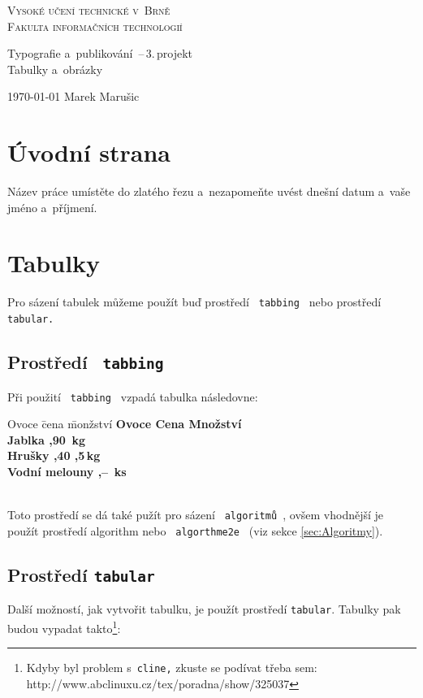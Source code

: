 \documentclass[11pt,a4paper,titlepage]{article}
\begin{document}
\begin{titlepage}

\begin{center}
\Huge\textsc{Vysoké učení technické v~Brně \\
\huge Fakulta informačních technologií\\}

\LARGE Typografie a~publikování \,--\,3.\,projekt \\
\Huge{Tabulky a~obrázky} \\
\end{center}
{\Large \today \hfill
Marek Marušic}
\end{titlepage}

\section{Úvodní strana}
Název práce umístěte do zlatého řezu a~nezapomeňte uvést dnešní datum a~vaše jméno a~příjmení.

\section{Tabulky}
Pro sázení tabulek můžeme použít buď prostředí \texttt{ tabbing } nebo prostředí \texttt{ tabular.}

\subsection{Prostředí \texttt{ tabbing }}
Při použití \texttt{ tabbing } vzpadá tabulka následovne:
\begin{tabbing}
Ovoce \qquad\qquad\= cena \qquad
\= monžství \kill
\bfseries Ovoce \>
\bfseries Cena \>
\bfseries Množství \\
Jablka ,90 \,kg\\
Hrušky ,40 ,5\,kg\\
Vodní melouny ,-- \,ks\\\\
\end{tabbing}
Toto prostředí se dá také pužít pro sázení \texttt{ algoritmů }, ovšem vhodnější je použít prostředí algorithm nebo 
\texttt{ algorthme2e } (viz sekce \ref{sec:Algoritmy}).

\subsection{Prostředí \texttt{tabular}}
Další možností, jak vytvořit tabulku, je použít prostředí \texttt{tabular}. Tabulky pak budou vypadat takto\footnote{Kdyby byl problem s~\texttt{cline,} zkuste se podívat třeba sem: http://www.abclinuxu.cz/tex/poradna/show/325037}:
\end{document}
